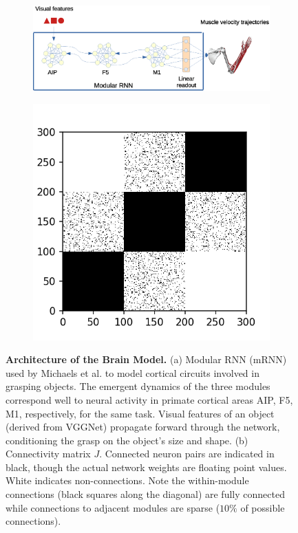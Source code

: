 \documentclass[12pt]{iopart}
\begin{document}
\begin{figure}
	\centering
	\begin{subfigure}[c]{0.69\textwidth}
		\centering
		\includegraphics[width=\textwidth]{michaels.eps}
		\caption{}
	\end{subfigure}
	\hfill
	\begin{subfigure}[c]{0.30\textwidth}
		\centering
		\includegraphics[width=\textwidth]{mRNN_J.png}
		\caption{}
	\end{subfigure}
	\hfill
\caption{\textbf{Architecture of the Brain Model.} (a) Modular RNN (mRNN) used by Michaels et al.
        \cite{michaels.mrnn} to model cortical circuits involved in grasping objects.
        The emergent dynamics of the three modules correspond well to neural activity in
        primate cortical areas AIP, F5, M1, respectively, for the same task. Visual
        features of an object (derived from VGGNet) propagate forward through the
		network, conditioning the grasp on the object's size and shape. (b)
		Connectivity matrix $J$. Connected neuron pairs are indicated in black, though the
		actual network weights are floating point values. White indicates non-connections.
		Note the within-module connections (black squares along	the diagonal) are fully
		connected while connections to adjacent modules are sparse
		($10\%$ of possible connections).}
\label{fig:michaels}
\end{figure}
\end{document}
